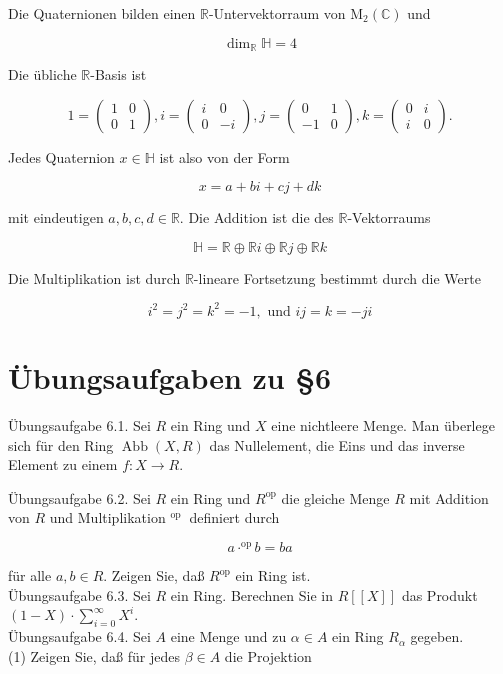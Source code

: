 \documentclass[10pt, letterpaper]{article}
\begin{document}
Die Quaternionen bilden einen $\mathbb{R}$-Untervektorraum von $\mathrm{M}_{2}(\mathbb{C})$ und

$$
\operatorname{dim}_{\mathbb{R}} \mathbb{H}=4
$$

Die übliche $\mathbb{R}$-Basis ist

$$
1=\left(\begin{array}{cc}
1 & 0 \\
0 & 1
\end{array}\right), i=\left(\begin{array}{cc}
i & 0 \\
0 & -i
\end{array}\right), j=\left(\begin{array}{cc}
0 & 1 \\
-1 & 0
\end{array}\right), k=\left(\begin{array}{cc}
0 & i \\
i & 0
\end{array}\right) .
$$

Jedes Quaternion $x \in \mathbb{H}$ ist also von der Form

$$
x=a+b i+c j+d k
$$

mit eindeutigen $a, b, c, d \in \mathbb{R}$. Die Addition ist die des $\mathbb{R}$-Vektorraums

$$
\mathbb{H}=\mathbb{R} \oplus \mathbb{R} i \oplus \mathbb{R} j \oplus \mathbb{R} k
$$

Die Multiplikation ist durch $\mathbb{R}$-lineare Fortsetzung bestimmt durch die Werte

$$
i^{2}=j^{2}=k^{2}=-1, \text { und } i j=k=-j i
$$

\section*{Übungsaufgaben zu §6}
Übungsaufgabe 6.1. Sei $R$ ein Ring und $X$ eine nichtleere Menge. Man überlege sich für den Ring $\operatorname{Abb}(X, R)$ das Nullelement, die Eins und das inverse Element zu einem $f: X \rightarrow R$.

Übungsaufgabe 6.2. Sei $R$ ein Ring und $R^{\mathrm{op}}$ die gleiche Menge $R$ mit Addition von $R$ und Multiplikation ${ }^{\text {op }}$ definiert durch

$$
a \cdot^{\mathrm{op}} b=b a
$$

für alle $a, b \in R$. Zeigen Sie, daß $R^{\mathrm{op}}$ ein Ring ist.\\
Übungsaufgabe 6.3. Sei $R$ ein Ring. Berechnen Sie in $R[[X]]$ das Produkt $(1-X) \cdot \sum_{i=0}^{\infty} X^{i}$.\\
Übungsaufgabe 6.4. Sei $A$ eine Menge und zu $\alpha \in A$ ein Ring $R_{\alpha}$ gegeben.\\
(1) Zeigen Sie, daß für jedes $\beta \in A$ die Projektion
\end{document}
